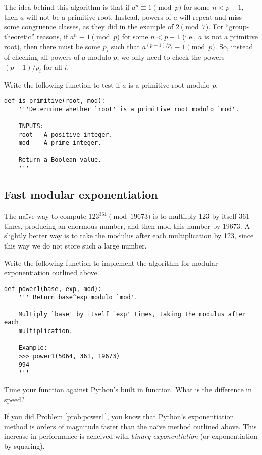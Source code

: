 The idea behind this algorithm is that if $a^n \equiv 1 \pmod{p}$ for some $n<p-1$, then $a$ will not be a primitive root.
Instead, powers of $a$ will repeat and miss some congruence classes, as they did in the example of $2 \pmod{7}$.
For ``group-theoretic'' reasons, if $a^n \equiv 1 \pmod{p}$ for some $n<p-1$ (i.e., $a$ is not a primitive root), then there must be some $p_i$ such that $a^{(p-1)/p_i} \equiv 1 \pmod{p}$.
So, instead of checking all powers of $a$ modulo $p$, we only need to check the powers $(p-1)/p_i$ for all $i$.

\begin{problem}
Write the following function to test if $a$ is a primitive root modulo $p$.
\begin{lstlisting}
def is_primitive(root, mod):
    '''Determine whether `root' is a primitive root modulo `mod'.
    
    INPUTS:
    root - A positive integer.
    mod  - A prime integer.
    
    Return a Boolean value.
    '''
\end{lstlisting}
\end{problem}


\subsection*{Fast modular exponentiation}
The na\"ive way to compute $123^{361} \pmod{19673}$ is to multilply 123 by itself 361 times, producing an enormous number, and then mod this number by 19673.
A slightly better way is to take the modulus after each multiplication by 123, since this way we do not store such a large number.

\begin{problem}\label{prob:power1}
Write the following function to implement the algorithm for modular exponentiation outlined above.
\begin{lstlisting}
def power1(base, exp, mod):
    ''' Return base^exp modulo `mod'.
    
    Multiply `base' by itself `exp' times, taking the modulus after each 
    multiplication.
    
    Example:
    >>> power1(5064, 361, 19673)
    994
    '''
\end{lstlisting}

Time your function against Python's built in  function.
What is the difference in speed?
\end{problem}

If you did Problem \ref{prob:power1}, you know that Python's exponentiation method is orders of magnitude faster than the na\"ive method outlined above.
This increase in performance is acheived with \emph{binary exponentiation} (or exponentiation by squaring).

